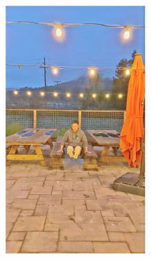 \documentclass[letterpaper,12pt]{article}
\begin{document}
\begin{figure}[htbp]
\begin{subfigure}{0.128\textwidth}
			\includegraphics[width=\linewidth]{LoLi-Phone-imgT_1/TBEFN}
			\captionsetup{font=scriptsize}
			\caption{}
			\label{fig: LoLi-Phone-imgT_1_h}  
		\end{subfigure}
		\begin{subfigure}{0.128\textwidth}

\end{subfigure}
\end{figure}
\end{document}
